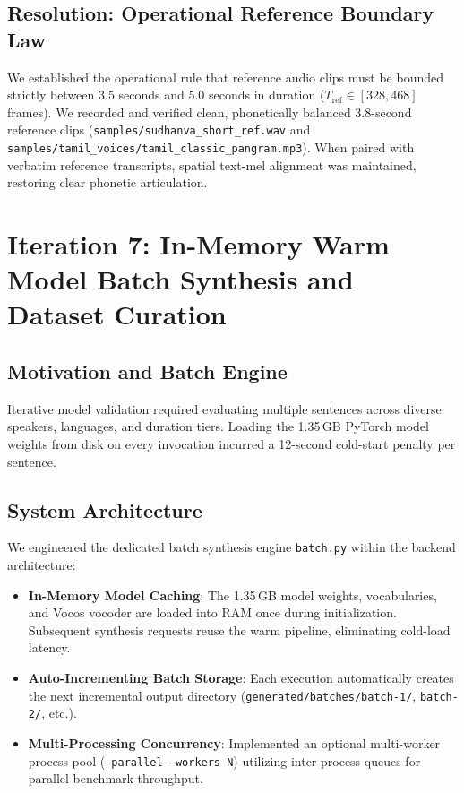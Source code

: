 \subsection{Resolution: Operational Reference Boundary Law}
We established the operational rule that reference audio clips must be bounded strictly between 3.5 seconds and 5.0 seconds in duration ($T_{\text{ref}} \in [328, 468]$ frames). We recorded and verified clean, phonetically balanced 3.8-second reference clips (\texttt{samples/sudhanva\_short\_ref.wav} and \texttt{samples/tamil\_voices/tamil\_classic\_pangram.mp3}). When paired with verbatim reference transcripts, spatial text-mel alignment was maintained, restoring clear phonetic articulation.

\section{Iteration 7: In-Memory Warm Model Batch Synthesis and Dataset Curation}
\subsection{Motivation and Batch Engine}
Iterative model validation required evaluating multiple sentences across diverse speakers, languages, and duration tiers. Loading the 1.35\,GB PyTorch model weights from disk on every invocation incurred a 12-second cold-start penalty per sentence.

\subsection{System Architecture}
We engineered the dedicated batch synthesis engine \texttt{batch.py} within the backend architecture:
\begin{itemize}
    \item \textbf{In-Memory Model Caching}: The 1.35\,GB model weights, vocabularies, and Vocos vocoder are loaded into RAM once during initialization. Subsequent synthesis requests reuse the warm pipeline, eliminating cold-load latency.
    \item \textbf{Auto-Incrementing Batch Storage}: Each execution automatically creates the next incremental output directory (\texttt{generated/batches/batch-1/}, \texttt{batch-2/}, etc.).
    \item \textbf{Multi-Processing Concurrency}: Implemented an optional multi-worker process pool (\texttt{--parallel --workers N}) utilizing inter-process queues for parallel benchmark throughput.
\end{itemize}

